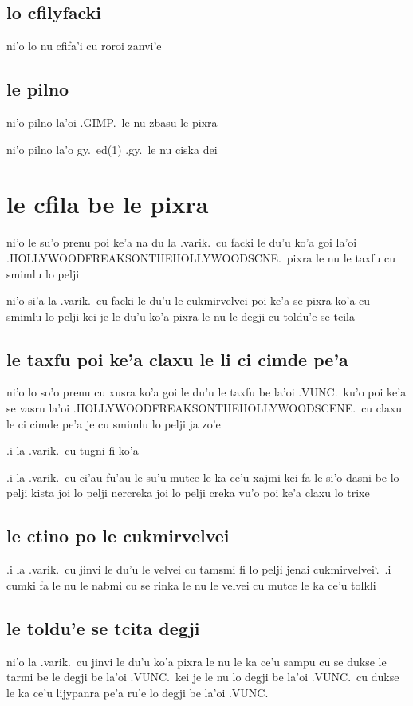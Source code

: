 \documentclass{report}
\newcommand\sds{\spacefactor\sfcode`.\ \space}
\begin{document}
\subsection{lo cfilyfacki}
ni'o lo nu cfifa'i cu roroi zanvi'e

\subsection{le pilno}
ni'o pilno la'oi .GIMP.\ le nu zbasu le pixra

ni'o pilno la'o gy.\ ed(1) .gy.\ le nu ciska dei

\section{le cfila be le pixra}
ni'o le su'o prenu poi ke'a na du la .varik.\ cu facki le du'u ko'a goi la'oi .HOLLYWOODFREAKSONTHEHOLLYWOODSCNE.\ pixra le nu le taxfu cu smimlu lo pelji

ni'o si'a la .varik.\ cu facki le du'u le cukmirvelvei poi ke'a se pixra ko'a cu smimlu lo pelji kei je le du'u ko'a pixra le nu le degji cu toldu'e se tcila

\subsection{le taxfu poi ke'a claxu le li ci cimde pe'a}
ni'o lo so'o prenu cu xusra ko'a goi le du'u le taxfu be la'oi .VUNC.\ ku'o poi ke'a se vasru la'oi .HOLLYWOODFREAKSONTHEHOLLYWOODSCENE.\ cu claxu le ci cimde pe'a je cu smimlu lo pelji ja zo'e

.i la .varik.\ cu tugni fi ko'a

.i la .varik.\ cu ci'au fu'au le su'u mutce le ka ce'u xajmi kei fa le si'o dasni be lo pelji kista joi lo pelji nercreka joi lo pelji creka vu'o poi ke'a claxu lo trixe

\subsection{le ctino po le cukmirvelvei}
.i la .varik.\ cu jinvi le du'u le velvei cu tamsmi fi lo pelji jenai cukmirvelvei\sds  .i cumki fa le nu le nabmi cu se rinka le nu le velvei cu mutce le ka ce'u tolkli

\subsection{le toldu'e se tcita degji}
ni'o la .varik.\ cu jinvi le du'u ko'a pixra le nu le ka ce'u sampu cu se dukse le tarmi be le degji be la'oi .VUNC.\ kei je le nu lo degji be la'oi .VUNC.\ cu dukse le ka ce'u lijypanra pe'a ru'e lo degji be la'oi .VUNC.
\end{document}
